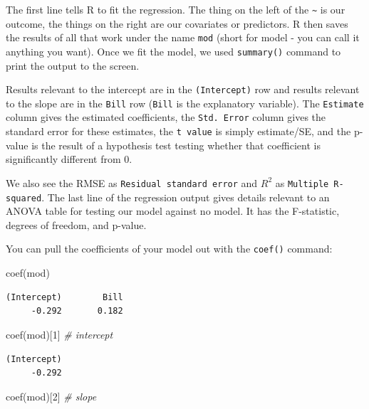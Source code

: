 \documentclass[
  letterpaper,
  DIV=11,
  numbers=noendperiod]{scrreprt}
\newenvironment{Shaded}{\begin{snugshade}}{\end{snugshade}}
\newcommand{\CommentTok}[1]{\textcolor[rgb]{0.38,0.63,0.69}{\textit{#1}}}
\newcommand{\DecValTok}[1]{\textcolor[rgb]{0.25,0.63,0.44}{#1}}
\newcommand{\FunctionTok}[1]{\textcolor[rgb]{0.02,0.16,0.49}{#1}}
\newcommand{\NormalTok}[1]{\textcolor[rgb]{0.00,0.44,0.13}{#1}}
\begin{document}
The first line tells R to fit the regression. The thing on the left of
the \texttt{\textasciitilde{}} is our outcome, the things on the right
are our covariates or predictors. R then saves the results of all that
work under the name \texttt{mod} (short for model - you can call it
anything you want). Once we fit the model, we used \texttt{summary()}
command to print the output to the screen.

Results relevant to the intercept are in the \texttt{(Intercept)} row
and results relevant to the slope are in the \texttt{Bill} row
(\texttt{Bill} is the explanatory variable). The \texttt{Estimate}
column gives the estimated coefficients, the \texttt{Std.\ Error} column
gives the standard error for these estimates, the \texttt{t\ value} is
simply estimate/SE, and the p-value is the result of a hypothesis test
testing whether that coefficient is significantly different from 0.

We also see the RMSE as \texttt{Residual\ standard\ error} and \(R^2\)
as \texttt{Multiple\ R-squared}. The last line of the regression output
gives details relevant to an ANOVA table for testing our model against
no model. It has the F-statistic, degrees of freedom, and p-value.

You can pull the coefficients of your model out with the \texttt{coef()}
command:

\begin{Shaded}
\begin{Highlighting}[]
\FunctionTok{coef}\NormalTok{(mod)}
\end{Highlighting}
\end{Shaded}

\begin{verbatim}
(Intercept)        Bill 
     -0.292       0.182 
\end{verbatim}

\begin{Shaded}
\begin{Highlighting}[]
\FunctionTok{coef}\NormalTok{(mod)[}\DecValTok{1}\NormalTok{] }\CommentTok{\# intercept}
\end{Highlighting}
\end{Shaded}

\begin{verbatim}
(Intercept) 
     -0.292 
\end{verbatim}

\begin{Shaded}
\begin{Highlighting}[]
\FunctionTok{coef}\NormalTok{(mod)[}\DecValTok{2}\NormalTok{] }\CommentTok{\# slope}
\end{Highlighting}
\end{Shaded}
\end{document}
